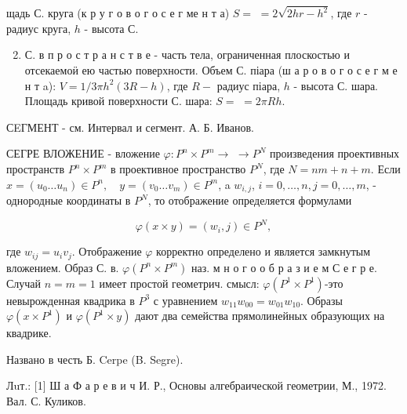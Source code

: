 \documentclass[10pt]{article}
\begin{document}
щадь С. круга (к р у г о в о г о с е г ме н т а) $S=$ $=2 \sqrt{2 h r-h^{2}}$, где $r$ - радиус круга, $h$ - высота С.



\begin{enumerate}

  \setcounter{enumi}{1}

  \item С. в п р о с т р а н с т в е - часть тела, ограниченная плоскостью и отсекаемоӥ ею частью поверхности. Объем С. піара (ш а р о в о г о с е г м е н т a): $V=1 / 3 \pi h^{2}(3 R-h)$, где $R-$ радиус піара, $h$ - высота С. шара. Площадь кривой поверхности С. шара: $S=$ $=2 \pi R h$.

\end{enumerate}



СEГМЕНТ - см. Интервал и сегмент. А. Б. Иванов.



СЕГРЕ ВЛОЖЕНИЕ - вложение $\varphi: P^{n} \times P^{m} \rightarrow$ $\rightarrow P^{N}$ произведения проективных пространств $P^{n} \times P^{m}$ в проективное пространство $P^{N}$, где $N=n m+n+m$. Если $x=\left(u_{0} \ldots u_{n}\right) \in P^{n}, \quad y=\left(v_{0} \ldots v_{m}\right) \in P^{m}$, a $w_{i, j}$, $i=0, \ldots, n, j=0, \ldots, m$, - однородные координаты в $P^{N}$, то отображение определяется формулами



\[

\varphi(x \times y)=\left(w_{i}, j\right) \in P^{N},

\]



где $w_{i j}=u_{i} v_{j}$. Отображение $\varphi$ корректно определено и является замкнутым вложением. Образ С. в. $\varphi\left(P^{n} \times P^{m}\right)$ наз. м н о г о о б р а з и е м С е г р е. Случай $n=m=1$ имеет простой геометрич. смысл: $\varphi\left(P^{1} \times P^{1}\right)$-это невырожденная квадрика в $P^{3}$ с уравнением $w_{11} w_{00}=w_{01} w_{10}$. Образы $\varphi\left(x \times P^{1}\right)$ и $\varphi\left(P^{1} \times y\right)$ дают два семейства прямолинейных образующих на квадрике.



Названо в честь Б. Cerpe (B. Segre).



Лuт.: [1] Ш а Ф а р е в и ч И. Р., Основы алгебраической геометрии, М., 1972. Вал. С. Куликов.
\end{document}
